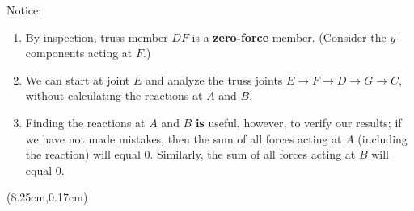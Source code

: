 \documentclass[8pt, xcolor={svgnames, x11names}]{beamer}
\begin{document}
\begin{frame}
\begin{textblock*}{10.5cm}
{\begin{statsbox}{Notice:}
      \begin{enumerate}
        \item<8-11> By inspection, truss member $DF$ is a \textcolor{statsMaroon}{\bfseries zero-force} member. (Consider the $y$-components acting at $F$.)\par
        \item<10-11> We can start at joint $E$ and analyze the truss joints $E\rightarrow F\rightarrow D\rightarrow G\rightarrow C$, without calculating the reactions at $A$ and $B$.\par
        \item<11> Finding the reactions at $A$ and $B$ {\bfseries is} useful, however, to verify our results; if we have not made mistakes, then the sum of all forces acting at $A$ (including the reaction) will equal $0$. Similarly, the sum of all forces acting at $B$ will equal $0$. 
      \end{enumerate}
    \end{statsbox}
  }
\end{textblock*}


  \begin{textblock*}{4.25cm}(8.25cm,0.17cm)
  \end{textblock*}


\end{frame}
\end{document}
